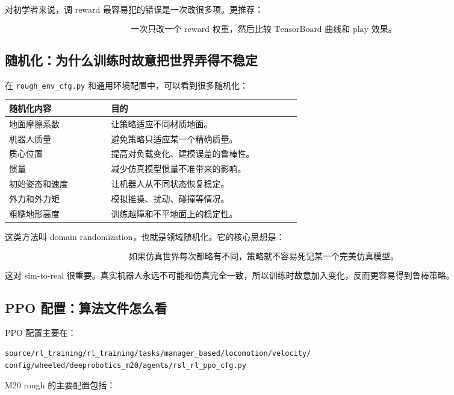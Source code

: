 \documentclass[UTF8,11pt,a4paper]{ctexart}
\begin{document}
对初学者来说，调 reward 最容易犯的错误是一次改很多项。更推荐：

\[
\boxed{
\text{一次只改一个 reward 权重，然后比较 TensorBoard 曲线和 play 效果。}
}
\]

\subsection{随机化：为什么训练时故意把世界弄得不稳定}

在 \texttt{rough\_env\_cfg.py} 和通用环境配置中，可以看到很多随机化：

\begin{center}
\begin{tabular}{p{0.28\linewidth}p{0.52\linewidth}}
\toprule
随机化内容 & 目的 \\
\midrule
地面摩擦系数 & 让策略适应不同材质地面。\\
机器人质量 & 避免策略只适应某一个精确质量。\\
质心位置 & 提高对负载变化、建模误差的鲁棒性。\\
惯量 & 减少仿真模型惯量不准带来的影响。\\
初始姿态和速度 & 让机器人从不同状态恢复稳定。\\
外力和外力矩 & 模拟推搡、扰动、碰撞等情况。\\
粗糙地形高度 & 训练越障和不平地面上的稳定性。\\
\bottomrule
\end{tabular}
\end{center}

这类方法叫 domain randomization，也就是领域随机化。它的核心思想是：

\[
\boxed{
\text{如果仿真世界每次都略有不同，策略就不容易死记某一个完美仿真模型。}
}
\]

这对 sim-to-real 很重要。真实机器人永远不可能和仿真完全一致，所以训练时故意加入变化，反而更容易得到鲁棒策略。

\subsection{PPO 配置：算法文件怎么看}

PPO 配置主要在：

\begin{verbatim}
source/rl_training/rl_training/tasks/manager_based/locomotion/velocity/
config/wheeled/deeprobotics_m20/agents/rsl_rl_ppo_cfg.py
\end{verbatim}

M20 rough 的主要配置包括：
\end{document}
